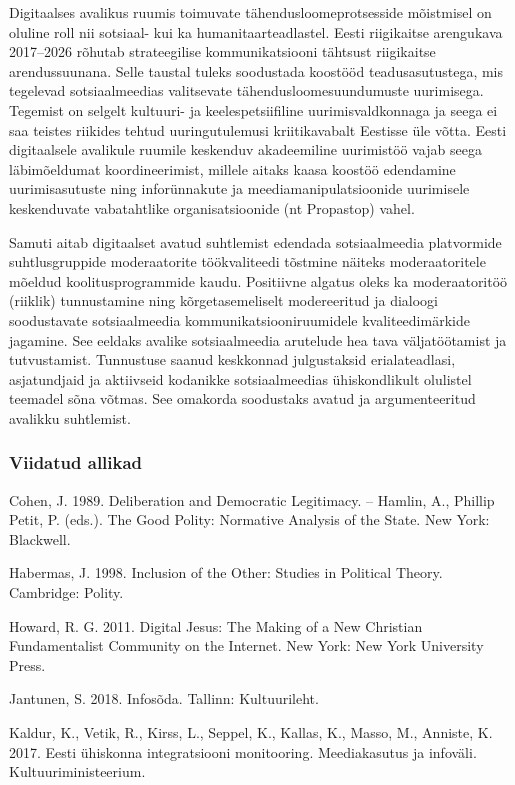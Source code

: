 \documentclass[estonian,]{article}
\begin{document}
Digitaalses avalikus ruumis toimuvate tähendusloomeprotsesside mõistmisel on oluline roll nii sotsiaal- kui ka humanitaarteadlastel. Eesti riigikaitse arengukava 2017--2026 rõhutab strateegilise kommunikatsiooni tähtsust riigikaitse arendussuunana. Selle taustal tuleks soodustada koostööd teadusasutustega, mis tegelevad sotsiaalmeedias valitsevate tähendusloomesuundumuste uurimisega. Tegemist on selgelt kultuuri- ja keelespetsiifiline uurimisvaldkonnaga ja seega ei saa teistes riikides tehtud uuringutulemusi kriitikavabalt Eestisse üle võtta. Eesti digitaalsele avalikule ruumile keskenduv akadeemiline uurimistöö vajab seega läbimõeldumat koordineerimist, millele aitaks kaasa koostöö edendamine uurimisasutuste ning inforünnakute ja meediamanipulatsioonide uurimisele keskenduvate vabatahtlike organisatsioonide (nt Propastop) vahel.

Samuti aitab digitaalset avatud suhtlemist edendada sotsiaalmeedia platvormide suhtlusgruppide moderaatorite töökvaliteedi tõstmine näiteks moderaatoritele mõeldud koolitusprogrammide kaudu. Positiivne algatus oleks ka moderaatoritöö (riiklik) tunnustamine ning kõrgetasemeliselt modereeritud ja dialoogi soodustavate sotsiaalmeedia kommunikatsiooniruumidele kvaliteedimärkide jagamine. See eeldaks avalike sotsiaalmeedia arutelude hea tava väljatöötamist ja tutvustamist. Tunnustuse saanud keskkonnad julgustaksid erialateadlasi, asjatundjaid ja aktiivseid kodanikke sotsiaalmeedias ühiskondlikult olulistel teemadel sõna võtmas. See omakorda soodustaks avatud ja argumenteeritud avalikku suhtlemist.

\hypertarget{viidatud-allikad-17}{%
\subsubsection*{Viidatud allikad}\label{viidatud-allikad-17}}

Cohen, J. 1989. Deliberation and Democratic Legitimacy. -- Hamlin, A., Phillip Petit, P. (eds.). The Good Polity: Normative Analysis of the State. New York: Blackwell.

Habermas, J. 1998. Inclusion of the Other: Studies in Political Theory. Cambridge: Polity.

Howard, R. G. 2011. Digital Jesus: The Making of a New Christian Fundamentalist Community on the Internet. New York: New York University Press.

Jantunen, S. 2018. Infosõda. Tallinn: Kultuurileht.

Kaldur, K., Vetik, R., Kirss, L., Seppel, K., Kallas, K., Masso, M., Anniste, K. 2017. Eesti ühiskonna integratsiooni monitooring. Meediakasutus ja infoväli. Kultuuriministeerium.
\end{document}
